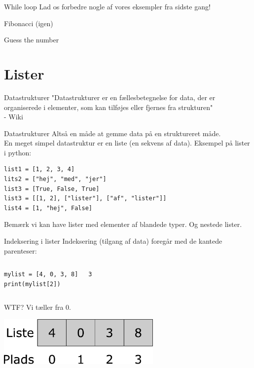 \begin{frame}[fragile]{While loop}
Lad os forbedre nogle af vores eksempler fra sidste gang!

Fibonacci (igen)

Guess the number
\end{frame}


\section{Lister}

\begin{frame}{Datastrukturer}
	\Large
	"Datastrukturer er en fællesbetegnelse for data, der er organiserede i elementer, som kan tilføjes eller fjernes fra strukturen"\\
	 - Wiki
\end{frame}


\begin{frame}[fragile]{Datastrukturer}
	Altså en måde at gemme data på en struktureret måde.\\
	En meget simpel datastruktur er en liste (en sekvens af data).
	\vfill
	Eksempel på lister i python:
	\begin{lstlisting}[style=python]
list1 = [1, 2, 3, 4]
lits2 = ["hej", "med", "jer"]
list3 = [True, False, True]
list3 = [[1, 2], ["lister"], ["af", "lister"]]
list4 = [1, "hej", False]
	\end{lstlisting}
	Bemærk vi kan have lister med elementer af blandede typer. Og nestede lister.
\end{frame}

\begin{frame}[fragile]{Indeksering i lister}
	Indeksering (tilgang af data) foregår med de kantede parenteser:
	\begin{columns}
		\begin{lstlisting}[style=python]
mylist = [4, 0, 3, 8]
print(mylist[2])
		\end{lstlisting}
		\pause
		\begin{lstlisting}[style=python]
3
		\end{lstlisting}
	\end{columns}
	WTF? \pause Vi tæller fra 0.
	\begin{center}
		\includegraphics[width=0.6\textwidth]{figs/list.pdf}
	\end{center}

\end{frame}

